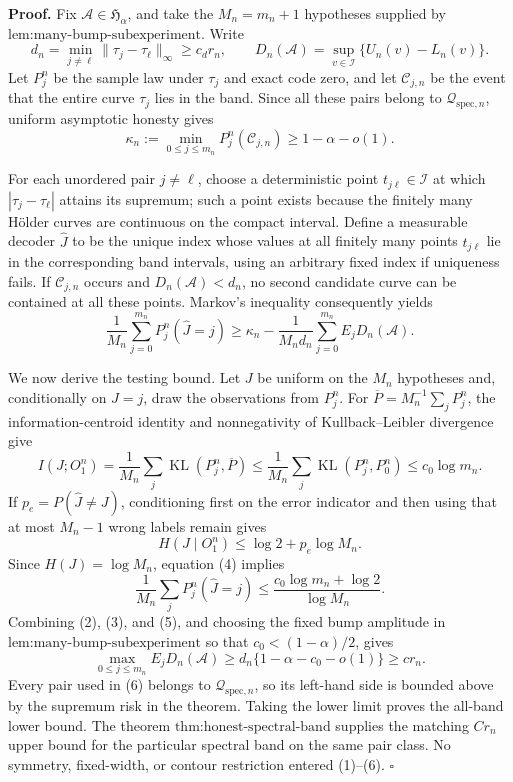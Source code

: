 \textbf{Proof.}
Fix \(\mathcal A\in\mathfrak H_\alpha\), and take the \(M_n=m_n+1\) hypotheses supplied by \(\text{lem:many-bump-subexperiment}\).  Write
\[
 d_n=\min_{j\ne\ell}\|\tau_j-\tau_\ell\|_\infty\ge c_dr_n,
 \qquad
 D_n(\mathcal A)=\sup_{v\in\mathcal I}\{U_n(v)-L_n(v)\}. \tag{1}
\]
Let \(P_j^n\) be the sample law under \(\tau_j\) and exact code zero, and let \(\mathcal C_{j,n}\) be the event that the entire curve \(\tau_j\) lies in the band.  Since all these pairs belong to \(\mathcal Q_{\mathrm{spec},n}\), uniform asymptotic honesty gives
\[
 \kappa_n:=\min_{0\le j\le m_n}P_j^n(\mathcal C_{j,n})
 \ge1-\alpha-o(1). \tag{2}
\]

For each unordered pair \(j\ne\ell\), choose a deterministic point \(t_{j\ell}\in\mathcal I\) at which \(|\tau_j-\tau_\ell|\) attains its supremum; such a point exists because the finitely many H\"older curves are continuous on the compact interval.  Define a measurable decoder \(\widehat J\) to be the unique index whose values at all finitely many points \(t_{j\ell}\) lie in the corresponding band intervals, using an arbitrary fixed index if uniqueness fails.  If \(\mathcal C_{j,n}\) occurs and \(D_n(\mathcal A)<d_n\), no second candidate curve can be contained at all these points.  Markov's inequality consequently yields
\[
 \frac1{M_n}\sum_{j=0}^{m_n}P_j^n(\widehat J=j)
 \ge \kappa_n-
 \frac1{M_nd_n}\sum_{j=0}^{m_n}E_jD_n(\mathcal A). \tag{3}
\]

We now derive the testing bound.  Let \(J\) be uniform on the \(M_n\) hypotheses and, conditionally on \(J=j\), draw the observations from \(P_j^n\).  For \(\overline P=M_n^{-1}\sum_jP_j^n\), the information-centroid identity and nonnegativity of Kullback--Leibler divergence give
\[
 I(J;O_1^n)=\frac1{M_n}\sum_j\operatorname{KL}(P_j^n,\overline P)
 \le\frac1{M_n}\sum_j\operatorname{KL}(P_j^n,P_0^n)
 \le c_0\log m_n. \tag{4}
\]
If \(p_e=P(\widehat J\ne J)\), conditioning first on the error indicator and then using that at most \(M_n-1\) wrong labels remain gives
\[
 H(J\mid O_1^n)\le\log2+p_e\log M_n.
\]
Since \(H(J)=\log M_n\), equation (4) implies
\[
 \frac1{M_n}\sum_jP_j^n(\widehat J=j)
 \le\frac{c_0\log m_n+\log2}{\log M_n}. \tag{5}
\]
Combining (2), (3), and (5), and choosing the fixed bump amplitude in \(\text{lem:many-bump-subexperiment}\) so that \(c_0<(1-\alpha)/2\), gives
\[
 \max_{0\le j\le m_n}E_jD_n(\mathcal A)
 \ge d_n\{1-\alpha-c_0-o(1)\}
 \ge c r_n. \tag{6}
\]
Every pair used in (6) belongs to \(\mathcal Q_{\mathrm{spec},n}\), so its left-hand side is bounded above by the supremum risk in the theorem.  Taking the lower limit proves the all-band lower bound.  The theorem \(\text{thm:honest-spectral-band}\) supplies the matching \(Cr_n\) upper bound for the particular spectral band on the same pair class.  No symmetry, fixed-width, or contour restriction entered (1)--(6). \(\square\)